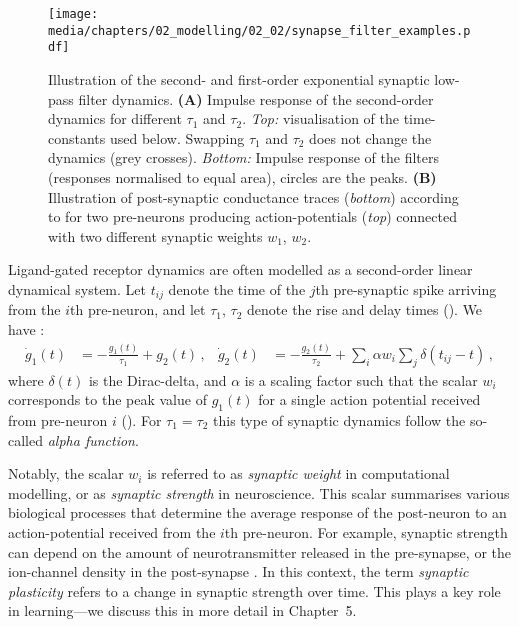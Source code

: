 \begin{figure}
	\texttt{[image: media/chapters/02\_modelling/02\_02/synapse\_filter\_examples.pdf]}
	{\label{fig:synapse_filter_examples_time_constants}}%
	{\label{fig:synapse_filter_examples_traces}}%
	\caption[Second- and first-order exponential synaptic low-pass filter dynamics]{Illustration of the second- and first-order exponential synaptic low-pass filter dynamics. \textbf{(A)} Impulse response of the second-order dynamics for different $\tau_1$ and $\tau_2$. \emph{Top:} visualisation of the time-constants used below. Swapping $\tau_1$ and $\tau_2$ does not change the dynamics (grey crosses). \emph{Bottom:} Impulse response of the filters (responses normalised to equal area), circles are the peaks. \textbf{(B)} Illustration of post-synaptic conductance traces (\emph{bottom}) according to  for two pre-neurons producing action-potentials (\emph{top}) connected with two different synaptic weights $w_1$, $w_2$.}
\end{figure}

Ligand-gated receptor dynamics are often modelled as a second-order linear dynamical system.
Let $t_{ij}$ denote the time of the $j$th pre-synaptic spike arriving from the $i$th pre-neuron, and let $\tau_1$, $\tau_2$ denote the rise and delay times ().
We have \citep{roth2009modeling}:
\begin{align}
	\dot g_1(t) &= -\frac{g_1(t)}{\tau_\mathrm{1}} + g_2(t) \,, &
	\dot g_2(t) &= -\frac{g_2(t)}{\tau_\mathrm{2}} + \sum\nolimits_{i} \alpha w_i \sum\nolimits_{j} \delta(t_{ij} - t) \,,
	\label{eqn:low_pass_second_order}
\end{align}
where $\delta(t)$ is the Dirac-delta, and $\alpha$ is a scaling factor such that the scalar $w_i$ corresponds to the peak value of $g_1(t)$ for a single action potential received from pre-neuron $i$ ().
For $\tau_1 = \tau_2$ this type of synaptic dynamics follow the so-called \emph{alpha function}.

Notably, the scalar $w_i$ is referred to as \emph{synaptic weight} in computational modelling, or as \emph{synaptic strength} in neuroscience.
This scalar summarises various biological processes that determine the average response of the post-neuron to an action-potential received from the $i$th pre-neuron.
For example, synaptic strength can depend on the amount of neurotransmitter released in the pre-synapse, or the ion-channel density in the post-synapse \citep[Chapter~12]{kandel2012principles}.
In this context, the term \emph{synaptic plasticity} refers to a change in synaptic strength over time.
This plays a key role in learning---we discuss this in more detail in Chapter~5.


